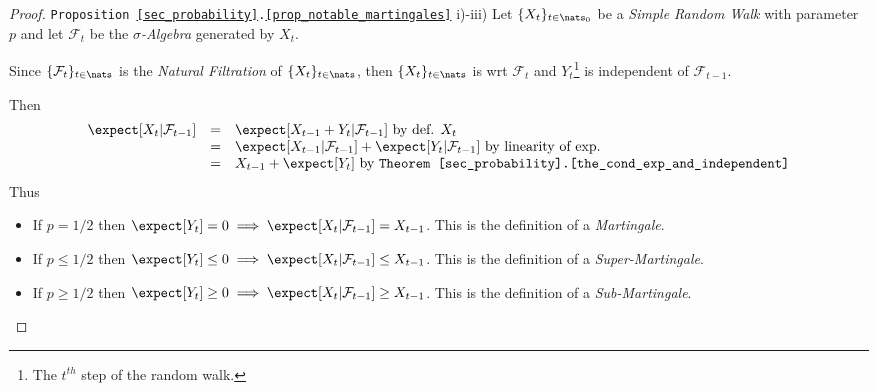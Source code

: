 \documentclass[11pt,a4paper]{article}
\begin{document}
  \begin{proof}{\texttt{Proposition \ref{sec_probability}.\ref{prop_notable_martingales}} i)-iii)}
    Let $\{X_t\}_{t\in\nats_0}$ be a \textit{Simple Random Walk} with parameter $p$ and let $\mathcal{F}_t$ be the \textit{$\sigma$-Algebra} generated by $X_t$.
    \par Since $\{\mathcal{F}_t\}_{t\in\nats}$ is the \textit{Natural Filtration} of $\{X_t\}_{t\in\nats}$, then $\{X_t\}_{t\in\nats}$ is  wrt $\mathcal{F}_t$ and $Y_t$\footnote{The $t^{th}$ step of the random walk.} is independent of $\mathcal{F}_{t-1}$.
    \par Then
    \[\begin{array}{rcl}
      \expect[X_t|\mathcal{F}_{t-1}]&=&\expect[X_{t-1}+Y_t|\mathcal{F}_{t-1}]\text{ by def. }X_t\\
      &=&\expect[X_{t-1}|\mathcal{F}_{t-1}]+\expect[Y_t|\mathcal{F}_{t-1}]\text{ by linearity of exp.}\\
      &=&X_{t-1}+\expect[Y_t]\text{ by \texttt{Theorem \ref{sec_probability}.\ref{the_cond_exp_and_independent}}}
    \end{array}\]
    Thus
    \begin{itemize}
      \item If $p=1/2$ then $\expect[Y_t]=0\implies\expect[X_t|\mathcal{F}_{t-1}]=X_{t-1}$. This is the definition of a \textit{Martingale}.
      \item If $p\leq1/2$ then $\expect[Y_t]\leq0\implies\expect[X_t|\mathcal{F}_{t-1}]\leq X_{t-1}$. This is the definition of a \textit{Super-Martingale}.
      \item If $p\geq1/2$ then $\expect[Y_t]\geq0\implies\expect[X_t|\mathcal{F}_{t-1}]\geq X_{t-1}$. This is the definition of a \textit{Sub-Martingale}.
    \end{itemize}
    \proved
  \end{proof}
\end{document}
